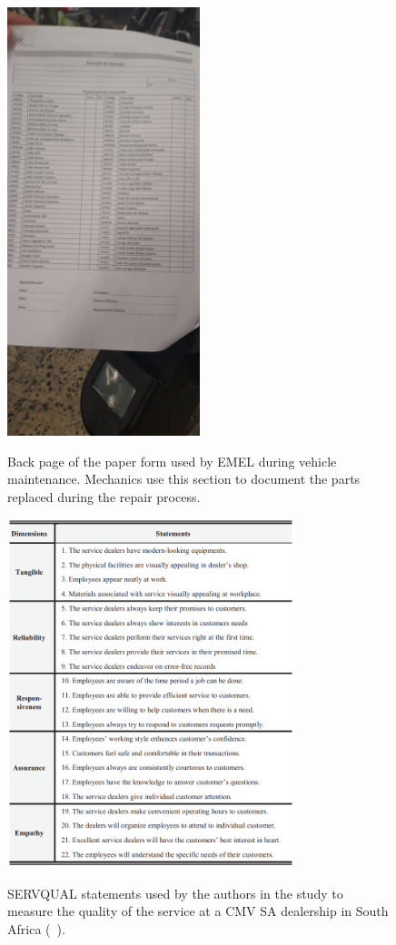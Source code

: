 \begin{figure}[htbp]
  \caption{Back page of the paper form used by EMEL during vehicle maintenance. Mechanics use this section to document the parts replaced during the repair process.}
  \centering
  \includegraphics[width=0.50\textwidth]{figs/chapter2/emel_back}
  \label{fig:emel_back}
\end{figure}


\begin{figure}[htbp]
  \caption{SERVQUAL statements used by the authors in the study to measure the quality of the service at a CMV SA dealership in South Africa (~\cite{Measuring_After_sales_Service_Quality}).}
  \centering
  \includegraphics[width=0.75\textwidth]{figs/SERVQUAL_statements}
  \label{fig:SERVQUAL_statements}
\end{figure}



